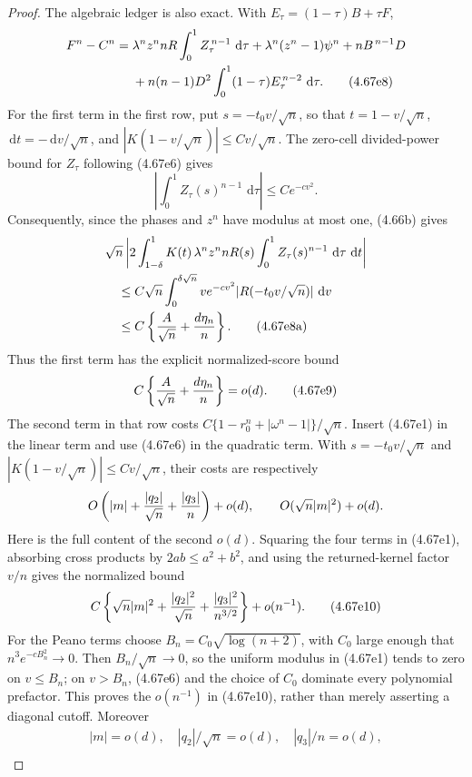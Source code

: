 \documentclass[11pt,a4paper]{article}
\numberwithin{equation}{section}
\theoremstyle{definition}
\theoremstyle{remark}
\newcommand{\dd}{\,\mathrm d}
\begin{document}
\begin{proof}
The algebraic ledger is also exact.  With
\(E_\tau=(1-\tau)B+\tau F\),
\begin{align}
 F^n-C^n={}&\lambda^nz^n nR\int_0^1Z_\tau^{\,n-1}\,\dd\tau
 +\lambda^n(z^n-1)\psi^n+nB^{\,n-1}D                         \notag\\
 &+n(n-1)D^2\int_0^1(1-\tau)E_\tau^{\,n-2}\,\dd\tau . \tag{4.67e8}
\end{align}
For the first term in the first row, put
$s=-t_0v/\sqrt n$, so that
$t=1-v/\sqrt n$, $\dd t=-\dd v/\sqrt n$, and
$|K(1-v/\sqrt n)|\le Cv/\sqrt n$.  The zero-cell divided-power bound for
$Z_\tau$ following (4.67e6) gives
\[
 \left|\int_0^1Z_\tau(s)^{n-1}\,\dd\tau\right|
      \le Ce^{-cv^2}.
\]
Consequently, since the phases and $z^n$ have modulus at most one,
(4.66b) gives
\begin{align}
 &\sqrt n\left|2\int_{1-\delta}^1K(t)\,
   \lambda^nz^n nR(s)
       \int_0^1Z_\tau(s)^{n-1}\,\dd\tau\,\dd t\right|\notag\\
 &\quad\le C\sqrt n\int_0^{\delta\sqrt n}
      v e^{-cv^2}|R(-t_0v/\sqrt n)|\,\dd v\notag\\
 &\quad\le C\left\{{A\over\sqrt n}+{d\eta_n\over n}\right\}.
                                                                   \tag{4.67e8a}
\end{align}
Thus the first term has the explicit normalized-score bound
\[
 C\left\{{A\over\sqrt n}+{d\eta_n\over n}\right\}=o(d).             \tag{4.67e9}
\]
The second term in that row costs
\(C\{1-r_0^n+|\omega^n-1|\}/\sqrt n\).  Insert (4.67e1) in the
linear term and use (4.67e6) in the quadratic term.  With
\(s=-t_0v/\sqrt n\) and \(|K(1-v/\sqrt n)|\le Cv/\sqrt n\), their costs
are respectively
\[
 O\left(|m|+{|q_2|\over\sqrt n}+{|q_3|\over n}\right)+o(d),
 \qquad O(\sqrt n|m|^2)+o(d).
\]
Here is the full content of the second $o(d)$.  Squaring the four terms in
(4.67e1), absorbing cross products by $2ab\le a^2+b^2$, and using the
returned-kernel factor \(v/n\) gives the normalized bound
\[
 C\left\{\sqrt n|m|^2+{|q_2|^2\over\sqrt n}
       +{|q_3|^2\over n^{3/2}}\right\}+o(n^{-1}).     \tag{4.67e10}
\]
For the Peano terms choose
\(B_n=C_0\sqrt{\log(n+2)}\), with $C_0$ large enough that
$n^3e^{-cB_n^2}\to0$.  Then $B_n/\sqrt n\to0$, so the uniform modulus in
(4.67e1) tends to zero on $v\le B_n$; on $v>B_n$, (4.67e6) and the
choice of $C_0$ dominate every polynomial prefactor.  This proves the
$o(n^{-1})$ in (4.67e10), rather than merely asserting a diagonal
cutoff.  Moreover
\[
\begin{gathered}
 |m|=o(d),\quad |q_2|/\sqrt n=o(d),\quad |q_3|/n=o(d),\\

\end{gathered}\]
\end{proof}
\end{document}
